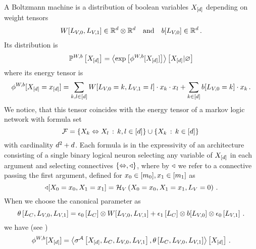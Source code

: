 A Boltzmann machine is a distribution of boolean variables $X_{[d]}$ depending on weight tensors %
\begin{align*}
	W[L_{V,0},L_{V,1}] \in\mathbb{R}^{d}\otimes\mathbb{R}^{d} \quad \text{and} \quad b[L_{V,0}] \in\mathbb{R}^{d} \, .
\end{align*}
Its distribution is
\begin{align*}
	\mathbb{P}^{W,b}\left[X_{[d]}\right] = \left\langle \mathrm{exp}\left[\phi^{W,b}[X_{[d]}]\right]\right\rangle \left[ X_{[d]} | \varnothing \right]
\end{align*}
where its energy tensor is
	\[ \phi^{W,b}[X_{[d]}=x_{[d]}] =
	\sum_{k,l \in [d]} 
		W[L_{V,0}=k, L_{V,1}=l] \cdot x_{k} \cdot x_{l} 
	+ \sum_{k\in[d]} b[L_{V,0}=k] \cdot x_{k}\, . \]
We notice, that this tensor coincides with the energy tensor of a markov logic network with formula set
	\[ \mathcal{F} = \{ X_{k} \Leftrightarrow X_{l} \, : \, k,l \in[d] \} 
	\cup \{ X_{k}\, : \, k\in[d] \} \, \]
with cardinality $d^2+d$.
Each formula is in the expressivity of an architecture consisting of a single binary logical neuron selecting any variable of $X_{[d]}$ in each argument and selecting connectives $\{\Leftrightarrow,\triangleleft\}$, where by $\triangleleft$ we refer to a connective passing the first argument, defined for $x_{0}\in[m_{0}], x_{1}\in[m_{1}]$ as 
	\[ \triangleleft[X_{0}=x_{0},X_{1}=x_{1}] = \mathcal{H}_{V}\left(X_{0}=x_{0},X_{1}=x_{1},L_{V}=0\right) \, . \]
When we choose the canonical parameter as
	\[ \theta\left[L_{C},L_{V,0},L_{V,1}\right]
	= \epsilon_{0}\left[L_{C}\right] \otimes W[L_{V,0},L_{V,1}]
	+ \epsilon_{1}\left[L_{C}\right] \otimes b[L_{V,0}] \otimes  \epsilon_{0}\left[L_{V,1}\right] \, .
	\]
we have (see )
	\[ \phi^{W,b}[X_{[d]}] = 
	\left\langle \sigma^{\mathcal{A}}\left[X_{[d]},L_{C},L_{V,0},L_{V,1}\right],
		\theta\left[L_{C},L_{V,0},L_{V,1}\right]\right\rangle \left[ X_{[d]} \right] \, . \]

